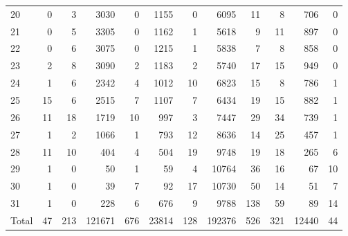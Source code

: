 \begin{table}
\begin{tabular}{lrrrrrrrrrrr}
20 & 0 & 3 & 3030 & 0 & 1155 & 0 & 6095 & 11 & 8 & 706 & 0 \\
21 & 0 & 5 & 3305 & 0 & 1162 & 1 & 5618 & 9 & 11 & 897 & 0 \\
22 & 0 & 6 & 3075 & 0 & 1215 & 1 & 5838 & 7 & 8 & 858 & 0 \\
23 & 2 & 8 & 3090 & 2 & 1183 & 2 & 5740 & 17 & 15 & 949 & 0 \\
24 & 1 & 6 & 2342 & 4 & 1012 & 10 & 6823 & 15 & 8 & 786 & 1 \\
25 & 15 & 6 & 2515 & 7 & 1107 & 7 & 6434 & 19 & 15 & 882 & 1 \\
26 & 11 & 18 & 1719 & 10 & 997 & 3 & 7447 & 29 & 34 & 739 & 1 \\
27 & 1 & 2 & 1066 & 1 & 793 & 12 & 8636 & 14 & 25 & 457 & 1 \\
28 & 11 & 10 & 404 & 4 & 504 & 19 & 9748 & 19 & 18 & 265 & 6 \\
29 & 1 & 0 & 50 & 1 & 59 & 4 & 10764 & 36 & 16 & 67 & 10 \\
30 & 1 & 0 & 39 & 7 & 92 & 17 & 10730 & 50 & 14 & 51 & 7 \\
31 & 1 & 0 & 228 & 6 & 676 & 9 & 9788 & 138 & 59 & 89 & 14 \\
Total & 47 & 213 & 121671 & 676 & 23814 & 128 & 192376 & 526 & 321 & 12440 & 44 \\
\end{tabular}
\end{table}
